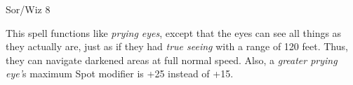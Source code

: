 
\begin{description*}
\item[Level:] Sor/Wiz 8
\end{description*}

This spell functions like \textit{prying eyes}, except that the eyes can see all
things as they actually are, just as if they had \textit{true seeing} with a range
of 120 feet. Thus, they can navigate darkened areas at full normal speed. Also,
a \textit{greater prying eye'}s maximum Spot modifier is +25 instead of +15.